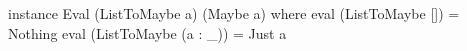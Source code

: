 \begin{code}
instance Eval (ListToMaybe a) (Maybe a) where
  eval (ListToMaybe [])      = Nothing
  eval (ListToMaybe (a : _)) = Just a
\end{code}
